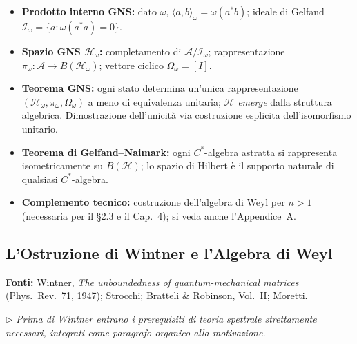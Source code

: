\documentclass[12pt, a4paper]{article}
\newcommand{\fonti}[1]{%
	\begin{fontebox}
		\textcolor{fontecolor}{\footnotesize\textbf{Fonti:} #1}
	\end{fontebox}%
}
\newcommand{\nota}[1]{%
	\par\smallskip
	\noindent\textit{\small $\triangleright$\; #1}
	\par\smallskip
}
\begin{document}
	\begin{itemize}
		\item \textbf{Prodotto interno GNS:} dato $\omega$, $\langle a,b\rangle_\omega=
		\omega(a^*b)$; ideale di Gelfand $\mathcal{I}_\omega=\{a:\omega(a^*a)=0\}$.
		\item \textbf{Spazio GNS $\mathcal{H}_\omega$:} completamento di
		$\mathcal{A}/\mathcal{I}_\omega$; rappresentazione $\pi_\omega:\mathcal{A}\to
		B(\mathcal{H}_\omega)$; vettore ciclico $\Omega_\omega=[I]$.
		\item \textbf{Teorema GNS:} ogni stato determina un'unica rappresentazione
		$(\mathcal{H}_\omega,\pi_\omega,\Omega_\omega)$ a meno di equivalenza unitaria;
		$\mathcal{H}$ \emph{emerge} dalla struttura algebrica. Dimostrazione dell'unicità
		via costruzione esplicita dell'isomorfismo unitario.
		\item \textbf{Teorema di Gelfand--Naimark:} ogni $C^*$-algebra astratta si
		rappresenta isometricamente su $B(\mathcal{H})$; lo spazio di Hilbert è il
		supporto naturale di qualsiasi $C^*$-algebra.
		\item \textbf{Complemento tecnico:} costruzione dell'algebra di Weyl per $n>1$
		(necessaria per il \S2.3 e il Cap.~4); si veda anche l'Appendice~A.
	\end{itemize}
	
	\subsection{L'Ostruzione di Wintner e l'Algebra di Weyl}
	
	\fonti{Wintner, \textit{The unboundedness of quantum-mechanical matrices}
		(Phys.\ Rev.\ 71, 1947); Strocchi;
		Bratteli \& Robinson, Vol.~II; Moretti.}
	
	\nota{Prima di Wintner entrano i prerequisiti di teoria spettrale strettamente
		necessari, integrati come paragrafo organico alla motivazione.}
	
\end{document}
